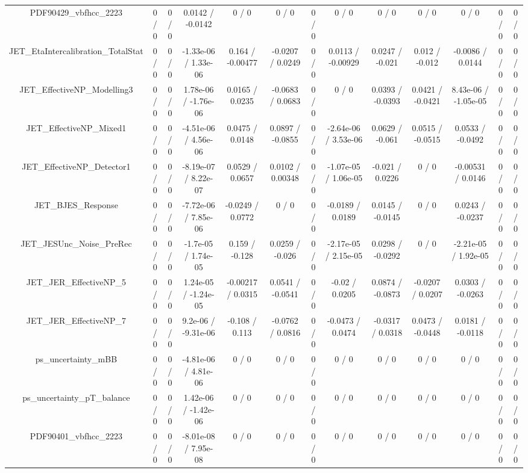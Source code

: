 \documentclass[10pt]{article}
\begin{document}
\begin{table}[htbp]
\begin{center}
\begin{tabular}{|c|c|c|c|c|c|c|c|c|c|c|c|c|}
  PDF90429_vbfhcc_2223 & 0 / 0 & 0 / 0 & 0.0142 / -0.0142 & 0 / 0 & 0 / 0 & 0 / 0 & 0 / 0 & 0 / 0 & 0 / 0 & 0 / 0 & 0 / 0 & 0 / 0 \\ 
  JET_EtaIntercalibration_TotalStat & 0 / 0 & 0 / 0 & -1.33e-06 / 1.33e-06 & 0.164 / -0.00477 & -0.0207 / 0.0249 & 0 / 0 & 0.0113 / -0.00929 & 0.0247 / -0.021 & 0.012 / -0.012 & -0.0086 / 0.0144 & 0 / 0 & 0 / 0 \\ 
  JET_EffectiveNP_Modelling3 & 0 / 0 & 0 / 0 & 1.78e-06 / -1.76e-06 & 0.0165 / 0.0235 & -0.0683 / 0.0683 & 0 / 0 & 0 / 0 & 0.0393 / -0.0393 & 0.0421 / -0.0421 & 8.43e-06 / -1.05e-05 & 0 / 0 & 0 / 0 \\ 
  JET_EffectiveNP_Mixed1 & 0 / 0 & 0 / 0 & -4.51e-06 / 4.56e-06 & 0.0475 / 0.0148 & 0.0897 / -0.0855 & 0 / 0 & -2.64e-06 / 3.53e-06 & 0.0629 / -0.061 & 0.0515 / -0.0515 & 0.0533 / -0.0492 & 0 / 0 & 0 / 0 \\ 
  JET_EffectiveNP_Detector1 & 0 / 0 & 0 / 0 & -8.19e-07 / 8.22e-07 & 0.0529 / 0.0657 & 0.0102 / 0.00348 & 0 / 0 & -1.07e-05 / 1.06e-05 & -0.021 / 0.0226 & 0 / 0 & -0.00531 / 0.0146 & 0 / 0 & 0 / 0 \\ 
  JET_BJES_Response & 0 / 0 & 0 / 0 & -7.72e-06 / 7.85e-06 & -0.0249 / 0.0772 & 0 / 0 & 0 / 0 & -0.0189 / 0.0189 & 0.0145 / -0.0145 & 0 / 0 & 0.0243 / -0.0237 & 0 / 0 & 0 / 0 \\ 
  JET_JESUnc_Noise_PreRec & 0 / 0 & 0 / 0 & -1.7e-05 / 1.74e-05 & 0.159 / -0.128 & 0.0259 / -0.026 & 0 / 0 & -2.17e-05 / 2.15e-05 & 0.0298 / -0.0292 & 0 / 0 & -2.21e-05 / 1.92e-05 & 0 / 0 & 0 / 0 \\ 
  JET_JER_EffectiveNP_5 & 0 / 0 & 0 / 0 & 1.24e-05 / -1.24e-05 & -0.00217 / 0.0315 & 0.0541 / -0.0541 & 0 / 0 & -0.02 / 0.0205 & 0.0874 / -0.0873 & -0.0207 / 0.0207 & 0.0303 / -0.0263 & 0 / 0 & 0 / 0 \\ 
  JET_JER_EffectiveNP_7 & 0 / 0 & 0 / 0 & 9.2e-06 / -9.31e-06 & -0.108 / 0.113 & -0.0762 / 0.0816 & 0 / 0 & -0.0473 / 0.0474 & -0.0317 / 0.0318 & 0.0473 / -0.0448 & 0.0181 / -0.0118 & 0 / 0 & 0 / 0 \\ 
  ps_uncertainty_mBB & 0 / 0 & 0 / 0 & -4.81e-06 / 4.81e-06 & 0 / 0 & 0 / 0 & 0 / 0 & 0 / 0 & 0 / 0 & 0 / 0 & 0 / 0 & 0 / 0 & 0 / 0 \\ 
  ps_uncertainty_pT_balance & 0 / 0 & 0 / 0 & 1.42e-06 / -1.42e-06 & 0 / 0 & 0 / 0 & 0 / 0 & 0 / 0 & 0 / 0 & 0 / 0 & 0 / 0 & 0 / 0 & 0 / 0 \\ 
  PDF90401_vbfhcc_2223 & 0 / 0 & 0 / 0 & -8.01e-08 / 7.95e-08 & 0 / 0 & 0 / 0 & 0 / 0 & 0 / 0 & 0 / 0 & 0 / 0 & 0 / 0 & 0 / 0 & 0 / 0 \\ 

\end{tabular}
\end{center}
\end{table}
\end{document}

